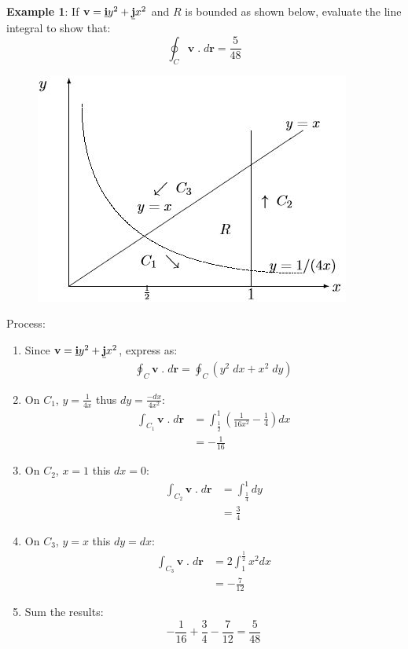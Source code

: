 \documentclass[10pt,a4paper]{article}
\begin{document}
\textbf{Example 1}: If $\textbf{v}=\textbf{\underline{i}}y^2+\textbf{\underline{j}}x^2$ and $R$ is
bounded as shown below, evaluate the line integral to show that:
$$
    \oint_C \textbf{v}\;.\;d \textbf{r} = \frac{5}{48}
$$
\begin{figure} [h!]
    \centering
    \includegraphics[scale=0.7]{Stokes_Ex1.JPG}
\end{figure}
Process:
\begin{enumerate}
    \item Since $\textbf{v}=\textbf{\underline{i}}y^2+\textbf{\underline{j}}x^2$, express as:
    \begin{align*}
        \oint_C \textbf{v}\;.\;d\textbf{r} = \oint_C(y^2\; dx + x^2\; dy)
    \end{align*}

    \item On $C_1$, $y=\frac{1}{4x}$ thus $dy=\frac{-dx}{4x^2}$:
    \begin{align*}
        \int_{C_1}\textbf{v}\;.\;d\textbf{r} &= \int_{\frac{1}{2}}^1\left(\frac{1}{16x^2}-\frac{1}{4}\right)dx \\
        &= -\frac{1}{16}
    \end{align*}
    \item On $C_2$, $x=1$ this $dx=0$:
    \begin{align*}
        \int_{C_2}\textbf{v}\;.\;d\textbf{r} &= \int_{\frac{1}{4}}^1 dy \\
        &= \frac{3}{4}
    \end{align*}
    \item On $C_3$, $y=x$ this $dy=dx$:
    \begin{align*}
        \int_{C_3}\textbf{v}\;.\;d\textbf{r} &= 2\int_{1}^{\frac{1}{2}} x^2 dx \\
        &= -\frac{7}{12}
    \end{align*}
    \item Sum the results:
    $$
        -\frac{1}{16}+\frac{3}{4}-\frac{7}{12} = \frac{5}{48}
    $$
\end{enumerate}
\end{document}
